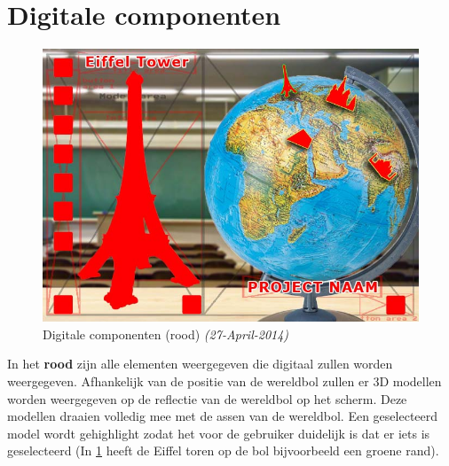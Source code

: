 \section{Digitale componenten} \label{sec:digicomponents}
\begin{figure}[h]
  \includegraphics[width=130mm]{figs/components4.jpg}
  \caption{Digitale componenten (rood) \textit{(27-April-2014)}}
  \label{fig:digitals}
\end{figure}

In het \textbf{{\color{red}rood}} zijn alle elementen weergegeven die digitaal zullen worden weergegeven. Afhankelijk van de positie van de wereldbol zullen er 3D modellen worden weergegeven op de reflectie van de wereldbol op het scherm. Deze modellen draaien volledig mee met de assen van de wereldbol. Een geselecteerd model wordt gehighlight zodat het voor de gebruiker duidelijk is dat er iets is geselecteerd (In \cref{fig:digitals} heeft de Eiffel toren op de bol bijvoorbeeld een groene rand). 

\newpage
